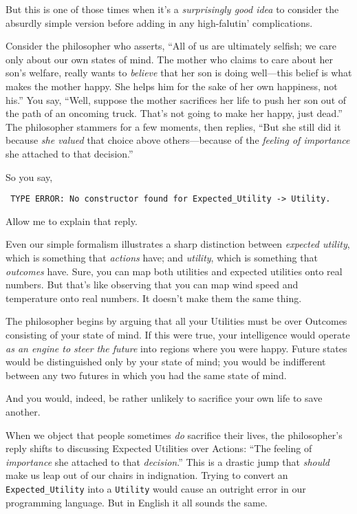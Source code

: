  But this is one of those times when it's a
\textit{surprisingly good idea} to consider the absurdly simple version
before adding in any high-falutin' complications.

{
 Consider the philosopher who asserts, ``All of us
are ultimately selfish; we care only about our own states of mind. The
mother who claims to care about her son's welfare,
really wants to \textit{believe} that her son is doing well---this
belief is what makes the mother happy. She helps him for the sake of
her own happiness, not his.'' You say,
``Well, suppose the mother sacrifices her life to push
her son out of the path of an oncoming truck. That's
not going to make her happy, just dead.'' The
philosopher stammers for a few moments, then replies,
``But she still did it because \textit{she valued}
that choice above others---because of the \textit{feeling of
importance} she attached to that decision.''}


 So you say,

\texttt{
 TYPE ERROR: No constructor found for Expected\_Utility
-{\textgreater} Utility.}


 Allow me to explain that reply.


 Even our simple formalism illustrates a sharp distinction between
\textit{expected utility}, which is something that \textit{actions}
have; and \textit{utility}, which is something that \textit{outcomes}
have. Sure, you can map both utilities and expected utilities onto real
numbers. But that's like observing that you can map
wind speed and temperature onto real numbers. It
doesn't make them the same thing.


 The philosopher begins by arguing that all your Utilities must be
over Outcomes consisting of your state of mind. If this were true, your
intelligence would operate \textit{as an engine to steer the future}
into regions where you were happy. Future states would be distinguished
only by your state of mind; you would be indifferent between any two
futures in which you had the same state of mind.


 And you would, indeed, be rather unlikely to sacrifice your own
life to save another.


 When we object that people sometimes \textit{do} sacrifice their
lives, the philosopher's reply shifts to discussing
Expected Utilities over Actions: ``The feeling of
\textit{importance} she attached to that
\textit{decision}.'' This is a drastic jump that
\textit{should} make us leap out of our chairs in indignation. Trying
to convert an \texttt{Expected\_Utility} into a \texttt{Utility} would cause an outright
error in our programming language. But in English it all sounds the
same.



